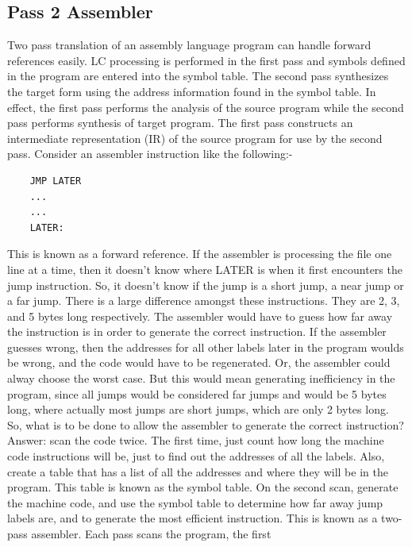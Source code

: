 \documentclass[a4paper,12pt]{extarticle}
\begin{document}
	\subsection{Pass 2 Assembler}
	Two pass translation of an assembly language program can handle forward references
	easily. LC processing is performed in the first pass and symbols defined in the program
	are entered into the symbol table. The second pass synthesizes the target form
	using the address information found in the symbol table. In effect, the first pass
	performs the analysis of the source program while the second pass performs synthesis
	of target program. The first pass constructs an intermediate representation (IR)
	of the source program for use by the second pass.\newline
	Consider an assembler instruction like the following:-
	\begin{verbatim}
	JMP LATER
	...
	...
	LATER:
	\end{verbatim}
	This is known as a forward reference. If the assembler is processing the file one
	line at a time, then it doesn’t know where LATER is when it first encounters the
	jump instruction. So, it doesn’t know if the jump is a short jump, a near jump or
	a far jump. There is a large difference amongst these instructions. They are 2, 3,
	and 5 bytes long respectively. The assembler would have to guess how far away the instruction is in order to generate the correct instruction. If the assembler guesses
	wrong, then the addresses for all other labels later in the program woulds be wrong,
	and the code would have to be regenerated. Or, the assembler could alway choose
	the worst case. But this would mean generating inefficiency in the program, since
	all jumps would be considered far jumps and would be 5 bytes long, where actually
	most jumps are short jumps, which are only 2 bytes long.\newline
	So, what is to be done to allow the assembler to generate the correct instruction?
	Answer: scan the code twice. The first time, just count how long the machine code
	instructions will be, just to find out the addresses of all the labels. Also, create a
	table that has a list of all the addresses and where they will be in the program.
	This table is known as the symbol table. On the second scan, generate the machine
	code, and use the symbol table to determine how far away jump labels are, and to
	generate the most efficient instruction.\newline
	This is known as a two-pass assembler. Each pass scans the program, the first
\end{document}
